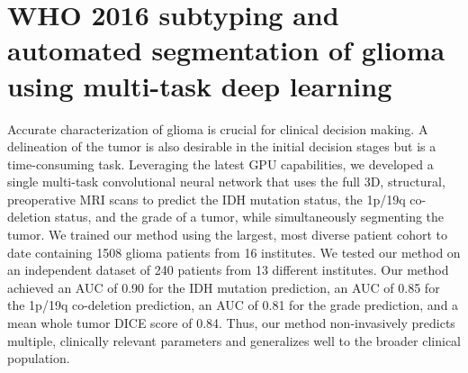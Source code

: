 \chapter[WHO 2016 subtyping and automated segmentation of glioma using multi-task deep learning][WHO 2016 subtyping]{WHO 2016 subtyping and automated segmentation of glioma using multi-task deep learning}\label{chap:prognosais}

\begin{ChapterAbstract}
    Accurate characterization of glioma is crucial for clinical decision making.
    A delineation of the \gls{tumor} is also desirable in the initial decision stages but is a time-consuming task.
    Leveraging the latest GPU capabilities, we developed a single multi-task convolutional neural network that uses the full 3D, structural, preoperative \acrshort{MRI} scans to predict the \acrshort{IDH} mutation status, the 1p/19q co-deletion status, and the grade of a \gls{tumor}, while simultaneously segmenting the \gls{tumor}.
    We trained our method using the largest, most diverse patient cohort to date containing 1508 glioma patients from 16 institutes.
    We tested our method on an independent dataset of 240  patients from 13 different institutes.
    Our method achieved an \acrshort{AUC} of 0.90 for the \acrshort{IDH} mutation prediction, an \acrshort{AUC} of 0.85 for the 1p/19q co-deletion prediction, an \acrshort{AUC} of 0.81 for the grade prediction, and a mean whole \gls{tumor} DICE score of 0.84.
    Thus, our method non-invasively predicts multiple, clinically relevant parameters and generalizes well to the broader clinical population.
\end{ChapterAbstract}


\setcellgapes{5pt}

